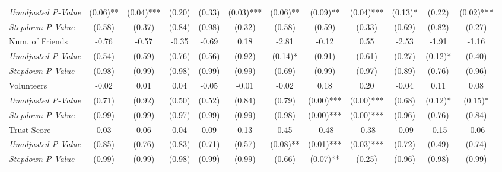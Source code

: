 \begin{tabular}{l c c c c c c c c c c c}
\quad \textit{Unadjusted P-Value} & (0.06)** & (0.04)*** & (0.20) & (0.33) & (0.03)*** & (0.06)** & (0.09)** & (0.04)*** & (0.13)* & (0.22) & (0.02)*** \\
\quad \textit{Stepdown P-Value} & (0.58) & (0.37) & (0.84) & (0.98) & (0.32) & (0.58) & (0.59) & (0.33) & (0.69) & (0.82) & (0.27) \\
Num. of Friends & -0.76 & -0.57 & -0.35 & -0.69 & 0.18 & -2.81 & -0.12 & 0.55 & -2.53 & -1.91 & -1.16 \\
\quad \textit{Unadjusted P-Value} & (0.54) & (0.59) & (0.76) & (0.56) & (0.92) & (0.14)* & (0.91) & (0.61) & (0.27) & (0.12)* & (0.40) \\
\quad \textit{Stepdown P-Value} & (0.98) & (0.99) & (0.98) & (0.99) & (0.99) & (0.69) & (0.99) & (0.97) & (0.89) & (0.76) & (0.96) \\
Volunteers & -0.02 & 0.01 & 0.04 & -0.05 & -0.01 & -0.02 & 0.18 & 0.20 & -0.04 & 0.11 & 0.08 \\
\quad \textit{Unadjusted P-Value} & (0.71) & (0.92) & (0.50) & (0.52) & (0.84) & (0.79) & (0.00)*** & (0.00)*** & (0.68) & (0.12)* & (0.15)* \\
\quad \textit{Stepdown P-Value} & (0.99) & (0.99) & (0.97) & (0.99) & (0.99) & (0.98) & (0.00)*** & (0.00)*** & (0.96) & (0.76) & (0.84) \\
Trust Score & 0.03 & 0.06 & 0.04 & 0.09 & 0.13 & 0.45 & -0.48 & -0.38 & -0.09 & -0.15 & -0.06 \\
\quad \textit{Unadjusted P-Value} & (0.85) & (0.76) & (0.83) & (0.71) & (0.57) & (0.08)** & (0.01)*** & (0.03)*** & (0.72) & (0.49) & (0.74) \\
\quad \textit{Stepdown P-Value} & (0.99) & (0.99) & (0.98) & (0.99) & (0.99) & (0.66) & (0.07)** & (0.25) & (0.96) & (0.98) & (0.99) \\
\bottomrule
\end{tabular}
